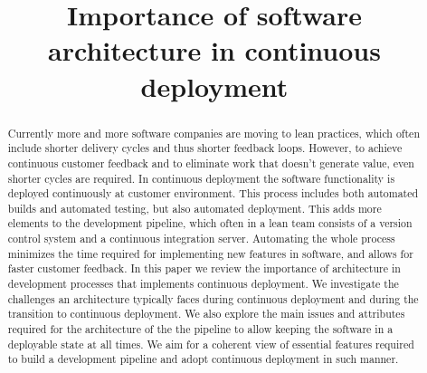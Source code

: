 \documentclass[conference]{IEEEtran}
\begin{document}
\title{Importance of software architecture in continuous deployment}

\author{
}

\maketitle


\begin{abstract}
Currently more and more software companies are moving to lean practices, which often include shorter delivery cycles and thus shorter feedback loops. However, to achieve continuous customer feedback and to eliminate work that doesn't generate value, even shorter cycles are required. In continuous deployment the software functionality is deployed continuously at customer environment. This process includes both automated builds and automated testing, but also automated deployment. This adds more elements to the development pipeline, which often in a lean team consists of a version control system and a continuous integration server. Automating the whole process minimizes the time required for implementing new features in software, and allows for faster customer feedback. In this paper we review the importance of architecture in development processes that implements continuous deployment. We investigate the challenges an architecture typically faces during continuous deployment and during the transition to continuous deployment. We also explore the main issues and attributes required for the architecture of the the pipeline to allow keeping the software in a deployable state at all times. We aim for a coherent view of essential features required to build a development pipeline and adopt continuous deployment in such manner. 
\end{abstract}

\end{document}
